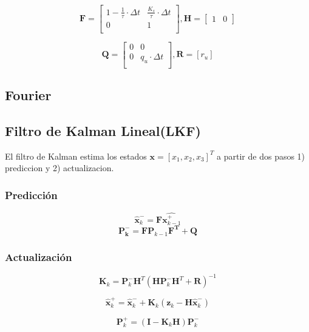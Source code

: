 \documentclass[conference]{IEEEtran}
\begin{document}
\[
	\mathbf{F} = \begin{bmatrix}
		1 -\frac{1}{\tau} \cdot \Delta t          & \frac{K_s}{\tau} \cdot \Delta t               \\
		0 & 1 \\
	\end{bmatrix},
	\mathbf{H} =
	\begin{bmatrix}
		1 & 0
	\end{bmatrix}
\]

\[
\mathbf{Q} = \begin{bmatrix}
	0 & 0  \\
	0 & q_u \cdot \Delta t \\
\end{bmatrix}, 
\mathbf{R} = [r_u]
\]



\subsection{Fourier}



\subsection{Filtro de Kalman Lineal(LKF)}

El filtro de Kalman estima los estados $\textbf{x} = [x_1, x_2, x_3]^T$ a partir de dos pasos 1) prediccion y 2) actualizacion.



\subsubsection{Predicci\'on}


\[
\hat{\mathbf{x}}_k^- = \mathbf{F}\hat{\mathbf{x}^+_{k-1}}
\]
\[
\mathbf{P^-_k} = \mathbf{F} \mathbf{P}_{k-1} \mathbf{F^T} + \mathbf{Q}
\]

\subsubsection{Actualizaci\'on}

\[
\mathbf{K}_k = \mathbf{P}_k^- \mathbf{H}^T \left( \mathbf{H} \mathbf{P}_k^- \mathbf{H}^T + \mathbf{R} \right)^{-1}
\]

\[
\hat{\mathbf{x}}_k^+ = \hat{\mathbf{x}}_k^- + \mathbf{K}_k \left( \mathbf{z}_k - \mathbf{H} \hat{\mathbf{x}}_k^- \right)
\]

\[
\mathbf{P}_k^+ = \left( \mathbf{I} - \mathbf{K}_k \mathbf{H} \right) \mathbf{P}_k^-
\]
\end{document}
